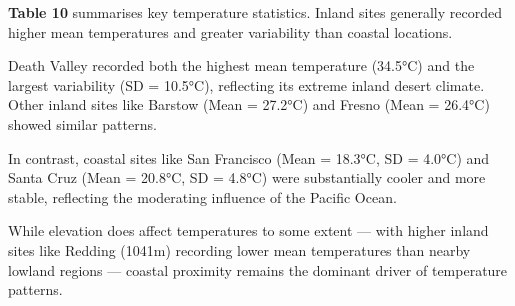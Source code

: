 \documentclass[
  11pt,
]{article}
\begin{document}
\textbf{Table 10} summarises key temperature statistics. Inland sites
generally recorded higher mean temperatures and greater variability than
coastal locations.

Death Valley recorded both the highest mean temperature (34.5°C) and the
largest variability (SD = 10.5°C), reflecting its extreme inland desert
climate. Other inland sites like Barstow (Mean = 27.2°C) and Fresno
(Mean = 26.4°C) showed similar patterns.

In contrast, coastal sites like San Francisco (Mean = 18.3°C, SD =
4.0°C) and Santa Cruz (Mean = 20.8°C, SD = 4.8°C) were substantially
cooler and more stable, reflecting the moderating influence of the
Pacific Ocean.

While elevation does affect temperatures to some extent --- with higher
inland sites like Redding (1041m) recording lower mean temperatures than
nearby lowland regions --- coastal proximity remains the dominant driver
of temperature patterns.
\end{document}
